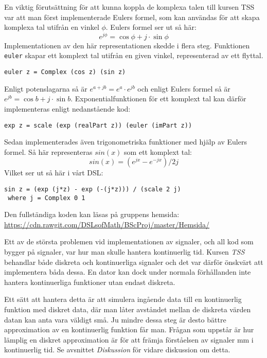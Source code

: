 \documentclass[]{article}
\begin{document}
En viktig förutsättning för att kunna koppla de komplexa talen till
kursen TSS var att man först implementerade Eulers formel, som kan
användas för att skapa komplexa tal utifrån en vinkel \(\phi\). Eulers
formel ser ut så här:
\[e^{j\phi}=\cos \phi+ j \cdot \sin \phi \]
Implementationen av den här representationen skedde i flera steg.
Funktionen \texttt{euler} skapar ett komplext tal utifrån
en given vinkel, representerad av ett flyttal.
\begin{verbatim}
euler z = Complex (cos z) (sin z)
\end{verbatim}
Enligt potenslagarna %
så är \(e^{a+jb} = e^{a} \cdot e^{jb}\) och enligt Eulers formel så är
\(e^{j b} = \cos b + j\cdot \sin b\).
%
Exponentialfunktionen för ett komplext tal kan därför implementeras
enligt nedanstående kod:

\begin{verbatim}
exp z = scale (exp (realPart z)) (euler (imPart z))
\end{verbatim}
Sedan implementerades även trigonometriska funktioner med hjälp av
Eulers formel. Så här representeras $sin(x)$ som ett komplext tal:
\[ sin(x) = (e^{j x} - e^{-j x}) / 2 j \]
Vilket ser ut så här i vårt DSL:
\begin{verbatim}
sin z = (exp (j*z) - exp (-(j*z))) / (scale 2 j)
 where j = Complex 0 1
\end{verbatim}

Den fullständiga koden kan läsas på gruppens hemsida:
\url{https://cdn.rawgit.com/DSLsofMath/BScProj/master/Hemsida/}

Ett av de största problemen vid implementationen av signaler, och all
kod som bygger på signaler, var hur man skulle hantera kontinuerlig
tid. Kursen \textit{TSS} behandlar både diskreta och kontinuerliga
signaler och det var därför önskvärt att implementera båda dessa. En
dator kan dock under normala förhållanden inte hantera kontinuerliga
funktioner utan endast diskreta. %

Ett sätt att hantera detta är att simulera ingående data till en
kontinuerlig funktion med diskret data, där man låter avståndet mellan
de diskreta värden datan kan anta vara väldigt små. Ju mindre dessa
steg är desto bättre approximation av en kontinuerlig funktion får
man. Frågan som uppstår är hur lämplig en diskret approximation är för
att främja förståelsen av signaler mm i kontinuerlig tid. Se avsnittet
\textit{Diskussion} för vidare diskussion om detta.
\end{document}

